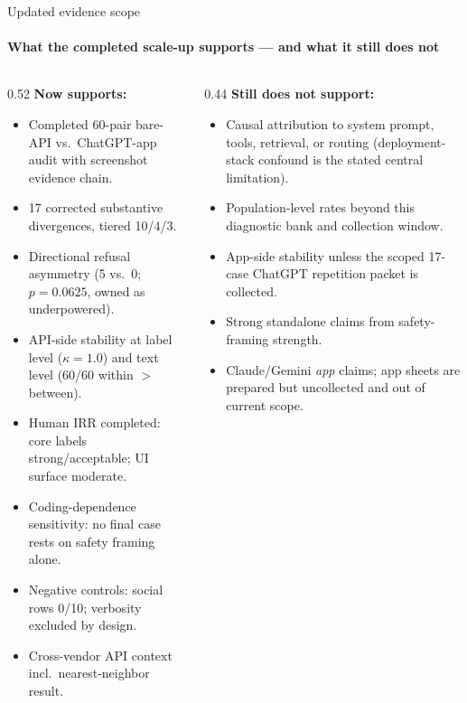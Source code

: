 \documentclass[aspectratio=169,onlytextwidth]{beamer}
\newcommand{\cmark}{\ding{51}}
\newcommand{\xmark}{\ding{55}}
\begin{document}
\begin{frame}[shrink=10]{Updated evidence scope}
\framesubtitle{What the completed scale-up supports --- and what it still does not}
\begin{columns}[T,totalwidth=\textwidth]
\begin{column}{0.52\textwidth}
\scriptsize\textbf{Now supports:}\\[3pt]
\begin{itemize}
  \item[\cmark] Completed 60-pair bare-API vs.\ ChatGPT-app audit with screenshot evidence chain.
  \item[\cmark] 17 corrected substantive divergences, tiered 10/4/3.
  \item[\cmark] Directional refusal asymmetry (5 vs.\ 0; $p=0.0625$, owned as underpowered).
  \item[\cmark] API-side stability at label level ($\kappa=1.0$) and text level (60/60 within $>$ between).
  \item[\cmark] Human IRR completed: core labels strong/acceptable; UI surface moderate.
  \item[\cmark] Coding-dependence sensitivity: no final case rests on safety framing alone.
  \item[\cmark] Negative controls: social rows 0/10; verbosity excluded by design.
  \item[\cmark] Cross-vendor API context incl.\ nearest-neighbor result.
\end{itemize}
\end{column}
\begin{column}{0.44\textwidth}
\scriptsize\textbf{Still does not support:}\\[3pt]
\begin{itemize}
  \item[\xmark] Causal attribution to system prompt, tools, retrieval, or routing (deployment-stack confound is the stated central limitation).
  \item[\xmark] Population-level rates beyond this diagnostic bank and collection window.
  \item[\xmark] App-side stability unless the scoped 17-case ChatGPT repetition packet is collected.
  \item[\xmark] Strong standalone claims from safety-framing strength.
  \item[\xmark] Claude/Gemini \emph{app} claims; app sheets are prepared but uncollected and out of current scope.
\end{itemize}
\end{column}
\end{columns}
\end{frame}
\end{document}
